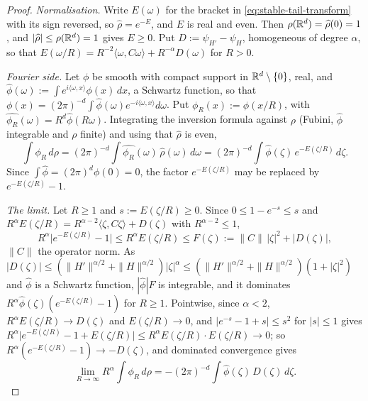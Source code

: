 \begin{proof}
\leanok
\emph{Normalisation.} Write $E(\omega)$ for the bracket in \ref{eq:stable-tail-transform} with its
sign reversed, so $\widehat\rho = e^{-E}$, and $E$ is real and even. Then $\rho(\mathbb{R}^d) =
\widehat\rho(0) = 1$, and $|\widehat\rho| \le \rho(\mathbb{R}^d) = 1$ gives $E \ge 0$. Put
$D := \psi_{H'} - \psi_H$, homogeneous of degree $\alpha$, so that
$E(\omega/R) = R^{-2}\langle\omega,C\omega\rangle + R^{-\alpha}D(\omega)$ for $R > 0$.

\emph{Fourier side.} Let $\phi$ be smooth with compact support in $\mathbb{R}^d \setminus \{0\}$, real,
and $\widehat\phi(\omega) := \int e^{i\langle\omega,x\rangle}\phi(x)\,dx$, a Schwartz function, so
that $\phi(x) = (2\pi)^{-d}\int\widehat\phi(\omega)e^{-i\langle\omega,x\rangle}d\omega$. Put
$\phi_R(x) := \phi(x/R)$, with $\widehat{\phi_R}(\omega) = R^d\widehat\phi(R\omega)$. Integrating
the inversion formula against $\rho$ (Fubini, $\widehat\phi$ integrable and $\rho$ finite) and using
that $\widehat\rho$ is even,
\[
  \int\phi_R\,d\rho = (2\pi)^{-d}\int\widehat{\phi_R}(\omega)\,\widehat\rho(\omega)\,d\omega
  = (2\pi)^{-d}\int\widehat\phi(\zeta)\,e^{-E(\zeta/R)}\,d\zeta .
\]
Since $\int\widehat\phi = (2\pi)^d\phi(0) = 0$, the factor $e^{-E(\zeta/R)}$ may be replaced by
$e^{-E(\zeta/R)} - 1$.

\emph{The limit.} Let $R \ge 1$ and $s := E(\zeta/R) \ge 0$. Since $0 \le 1 - e^{-s} \le s$ and
$R^\alpha E(\zeta/R) = R^{\alpha-2}\langle\zeta,C\zeta\rangle + D(\zeta)$ with $R^{\alpha-2} \le 1$,
\[
  R^\alpha\bigl|e^{-E(\zeta/R)} - 1\bigr| \le R^\alpha E(\zeta/R) \le F(\zeta)
  := \|C\|\,|\zeta|^2 + |D(\zeta)| ,
\]
$\|C\|$ the operator norm. As $|D(\zeta)| \le (\|H'\|^{\alpha/2} + \|H\|^{\alpha/2})|\zeta|^\alpha \le
(\|H'\|^{\alpha/2} + \|H\|^{\alpha/2})(1 + |\zeta|^2)$ and $\widehat\phi$ is a Schwartz function,
$|\widehat\phi|F$ is integrable, and it dominates
$R^\alpha\widehat\phi(\zeta)(e^{-E(\zeta/R)} - 1)$ for $R \ge 1$. Pointwise, since $\alpha < 2$,
$R^\alpha E(\zeta/R) \to D(\zeta)$ and $E(\zeta/R) \to 0$, and $|e^{-s} - 1 + s| \le s^2$ for
$|s| \le 1$ gives
$R^\alpha\bigl|e^{-E(\zeta/R)} - 1 + E(\zeta/R)\bigr| \le R^\alpha E(\zeta/R)\cdot E(\zeta/R) \to 0$;
so $R^\alpha(e^{-E(\zeta/R)} - 1) \to -D(\zeta)$, and dominated convergence gives
\[
  \lim_{R\to\infty}R^\alpha\int\phi_R\,d\rho = -(2\pi)^{-d}\int\widehat\phi(\zeta)\,D(\zeta)\,d\zeta .
\]


\end{proof}
